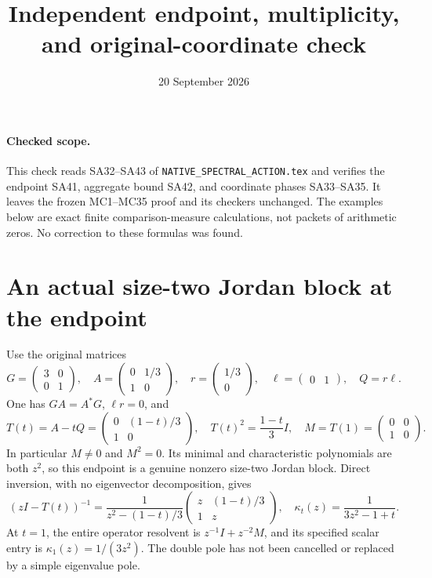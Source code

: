 \documentclass[11pt]{article}
\title{Independent endpoint, multiplicity, and original-coordinate check}
\author{}
\date{20 September 2026}
\begin{document}
\maketitle

\paragraph{Checked scope.}
This check reads SA32--SA43 of
\texttt{NATIVE\_SPECTRAL\_ACTION.tex} and verifies the endpoint
SA41, aggregate bound SA42, and coordinate phases SA33--SA35.
It leaves the frozen MC1--MC35 proof and its checkers unchanged.
The examples below are exact finite comparison-measure calculations,
not packets of arithmetic zeros. No correction to these formulas was found.

\section{An actual size-two Jordan block at the endpoint}

Use the original matrices
\begin{equation}
 G=\begin{pmatrix}3&0\\0&1\end{pmatrix},\quad
 A=\begin{pmatrix}0&1/3\\1&0\end{pmatrix},\quad
 r=\begin{pmatrix}1/3\\0\end{pmatrix},\quad
 \ell=\begin{pmatrix}0&1\end{pmatrix},\quad Q=r\ell.
 \tag{EC1}
\end{equation}
One has \(GA=A^*G\), \(\ell r=0\), and
\begin{equation}
 T(t)=A-tQ=\begin{pmatrix}0&(1-t)/3\\1&0\end{pmatrix},
 \quad T(t)^2=\frac{1-t}{3}I,\quad
 M=T(1)=\begin{pmatrix}0&0\\1&0\end{pmatrix}.
 \tag{EC2}
\end{equation}
In particular \(M\ne0\) and \(M^2=0\). Its minimal and
characteristic polynomials are both \(z^2\), so this endpoint is a
genuine nonzero size-two Jordan block.
Direct inversion, with no eigenvector decomposition, gives
\begin{equation}
 (zI-T(t))^{-1}
 =\frac1{z^2-(1-t)/3}
     \begin{pmatrix}z&(1-t)/3\\1&z\end{pmatrix},
 \quad
 \kappa_t(z)=\frac1{3z^2-1+t}.
 \tag{EC3}
\end{equation}
At \(t=1\), the entire operator resolvent is
\(z^{-1}I+z^{-2}M\), and its specified scalar entry is
\(\kappa_1(z)=1/(3z^2)\). The double pole has not been
cancelled or replaced by a simple eigenvalue pole.
\end{document}
